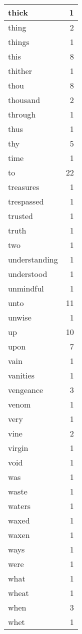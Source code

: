 \begin{center}
\begin{longtable}{l|r}
thick & 1 \\ \hline
thing & 2 \\ \hline
things & 1 \\ \hline
this & 8 \\ \hline
thither & 1 \\ \hline
thou & 8 \\ \hline
thousand & 2 \\ \hline
through & 1 \\ \hline
thus & 1 \\ \hline
thy & 5 \\ \hline
time & 1 \\ \hline
to & 22 \\ \hline
treasures & 1 \\ \hline
trespassed & 1 \\ \hline
trusted & 1 \\ \hline
truth & 1 \\ \hline
two & 1 \\ \hline
understanding & 1 \\ \hline
understood & 1 \\ \hline
unmindful & 1 \\ \hline
unto & 11 \\ \hline
unwise & 1 \\ \hline
up & 10 \\ \hline
upon & 7 \\ \hline
vain & 1 \\ \hline
vanities & 1 \\ \hline
vengeance & 3 \\ \hline
venom & 1 \\ \hline
very & 1 \\ \hline
vine & 2 \\ \hline
virgin & 1 \\ \hline
void & 1 \\ \hline
was & 1 \\ \hline
waste & 1 \\ \hline
waters & 1 \\ \hline
waxed & 1 \\ \hline
waxen & 1 \\ \hline
ways & 1 \\ \hline
were & 1 \\ \hline
what & 1 \\ \hline
wheat & 1 \\ \hline
when & 3 \\ \hline
whet & 1 \\ \hline

\end{longtable}
\end{center}

